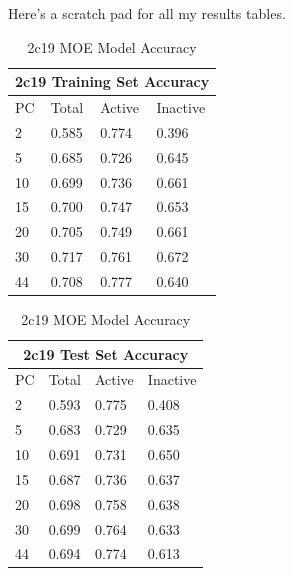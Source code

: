 Here's a scratch pad for all my results tables.


\begin{table}[!htb]
\begin{minipage}{.5\linewidth}
\centering
\begin{tabular}{|l|l|l|l|}
\hline
\multicolumn{4}{|c|}{2c19 Training Set Accuracy} \\ \hline
PC & Total          & Active          & Inactive \\ \hline
2  & 0.585          & 0.774           & 0.396   \\ \hline
5  & 0.685          & 0.726           & 0.645   \\ \hline
10 & 0.699          & 0.736           & 0.661    \\ \hline
15 & 0.700          & 0.747           & 0.653    \\ \hline
20 & 0.705          & 0.749           & 0.661    \\ \hline
30 & 0.717          & 0.761           & 0.672    \\ \hline
44 & 0.708          & 0.777           & 0.640    \\ \hline
\end{tabular}
\end{minipage}%
\begin{minipage}{.5\linewidth}
\centering
\begin{tabular}{|l|l|l|l|}
\hline
\multicolumn{4}{|c|}{2c19 Test Set Accuracy}       \\ \hline
PC & Total          & Active          & Inactive   \\ \hline
2  & 0.593          & 0.775           & 0.408      \\ \hline
5  & 0.683          & 0.729           & 0.635      \\ \hline
10 & 0.691          & 0.731           & 0.650      \\ \hline
15 & 0.687          & 0.736           & 0.637      \\ \hline
20 & 0.698          & 0.758           & 0.638      \\ \hline
30 & 0.699          & 0.764           & 0.633      \\ \hline
44 & 0.694          & 0.774           & 0.613      \\ \hline
\end{tabular}
\end{minipage}
\caption{2c19 MOE Model Accuracy}
\end{table}

